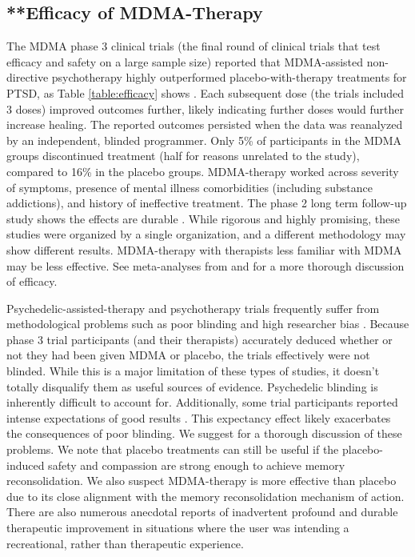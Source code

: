 \documentclass[12pt,letterpaper]{book}
\begin{document}
\subsection{**Efficacy of MDMA-Therapy}
The MDMA phase 3 clinical trials (the final round of clinical trials that test efficacy and safety on a large sample size) reported that MDMA-assisted non-directive psychotherapy highly outperformed placebo-with-therapy treatments for PTSD, as Table \ref{table:efficacy} shows \cite{mitchellMDMAClinicalTrial,mitchellMDMAClinicalTrial2}. Each subsequent dose (the trials included 3 doses) improved outcomes further, likely indicating further doses would further increase healing. The reported outcomes persisted when the data was reanalyzed by an independent, blinded programmer. Only 5\% of participants in the MDMA groups discontinued treatment (half for reasons unrelated to the study), compared to 16\% in the placebo groups. MDMA-therapy worked across severity of symptoms, presence of mental illness comorbidities (including substance addictions), and history of ineffective treatment. The phase 2 long term follow-up study shows the effects are durable \cite{jeromeMDMALongTerm}. While rigorous and highly promising, these studies were organized by a single organization, and a different methodology may show different results. MDMA-therapy with therapists less familiar with MDMA may be less effective. See meta-analyses from \textcite{greenMeta} and \textcite{smithSystematic} for a more thorough discussion of efficacy.

Psychedelic-assisted-therapy and psychotherapy trials frequently suffer from methodological problems such as poor blinding and high researcher bias \cite{adayMethodologicalRigor}. Because phase 3 trial participants (and their therapists) accurately deduced whether or not they had been given MDMA or placebo, the trials effectively were not blinded. While this is a major limitation of these types of studies, it doesn't totally disqualify them as useful sources of evidence. Psychedelic blinding is inherently difficult to account for. Additionally, some trial participants reported intense expectations of good results \cite{powerTrip}. This expectancy effect likely exacerbates the consequences of poor blinding. We suggest \textcite{vanElkMethodology} for a thorough discussion of these problems. We note that placebo treatments can still be useful if the placebo-induced safety and compassion are strong enough to achieve memory reconsolidation. We also suspect MDMA-therapy is more effective than placebo due to its close alignment with the memory reconsolidation mechanism of action. There are also numerous anecdotal reports of inadvertent profound and durable therapeutic improvement in situations where the user was intending a recreational, rather than therapeutic experience.
\end{document}
